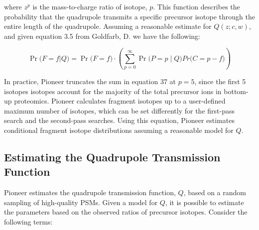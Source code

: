\documentclass[pdflatex,sn-nature]{sn-jnl}
\begin{document}
where $z^{p}$ is the mass-to-charge ratio of isotope, $p$.
This function describes the probability that the quadrupole transmits a specific precursor isotope through the entire length of the quadrupole. Assuming a reasonable estimate for $Q(z; c, w)$, and given equation 3.5 from Goldfarb, D. we have the following: 

\begin{equation}
    \Pr\bigl( F=f | Q) =\Pr\bigl(F = f\bigr) \cdot \left(\sum\limits_{p = 0}^{\infty} \Pr\bigl( P=p \mid Q)Pr\bigl(C = p - f\bigr) \right)
\end{equation}

In practice, Pioneer truncates the sum in equation 37 at $p=5$, since the first 5 isotopes isotopes account for the majority of the total precursor ions in bottom-up proteomics. Pioneer calculates fragment isotopes up to a user-defined maximum number of isotopes, which can be set differently for the first-pass search and the second-pass searches. Using this equation, Pioneer estimates conditional fragment isotope distributions assuming a reasonable model for $Q$.



\subsection{Estimating the Quadrupole Transmission Function}\label{subsec:estimating-quadrupole-transmission}
Pioneer estimates the quadrupole transmission function, $Q$, based on a random sampling of high-quality PSMs. Given a model for $Q$, it is possible to estimate the parameters based on the observed ratios of precursor isotopes. Consider the following terms:
\end{document}
